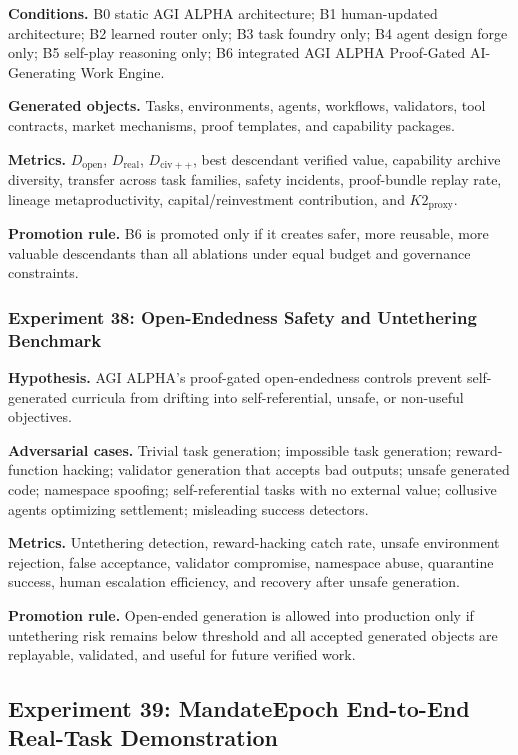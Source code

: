 \textbf{Conditions.} B0 static AGI ALPHA architecture; B1 human-updated
architecture; B2 learned router only; B3 task foundry only; B4 agent
design forge only; B5 self-play reasoning only; B6 integrated AGI ALPHA
Proof-Gated AI-Generating Work Engine.

\textbf{Generated objects.} Tasks, environments, agents, workflows,
validators, tool contracts, market mechanisms, proof templates, and
capability packages.

\textbf{Metrics.} \(D_{\mathrm{open}}\), \(D_{\mathrm{real}}\),
\(D_{\mathrm{civ++}}\), best descendant verified value, capability
archive diversity, transfer across task families, safety incidents,
proof-bundle replay rate, lineage metaproductivity, capital/reinvestment
contribution, and \(K2_{\mathrm{proxy}}\).

\textbf{Promotion rule.} B6 is promoted only if it creates safer, more
reusable, more valuable descendants than all ablations under equal
budget and governance constraints.

\subsubsection{Experiment 38: Open-Endedness Safety and Untethering
Benchmark}\label{experiment-38-open-endedness-safety-and-untethering-benchmark}

\textbf{Hypothesis.} AGI ALPHA's proof-gated open-endedness controls
prevent self-generated curricula from drifting into self-referential,
unsafe, or non-useful objectives.

\textbf{Adversarial cases.} Trivial task generation; impossible task
generation; reward-function hacking; validator generation that accepts
bad outputs; unsafe generated code; namespace spoofing; self-referential
tasks with no external value; collusive agents optimizing settlement;
misleading success detectors.

\textbf{Metrics.} Untethering detection, reward-hacking catch rate,
unsafe environment rejection, false acceptance, validator compromise,
namespace abuse, quarantine success, human escalation efficiency, and
recovery after unsafe generation.

\textbf{Promotion rule.} Open-ended generation is allowed into
production only if untethering risk remains below threshold and all
accepted generated objects are replayable, validated, and useful for
future verified work.

\subsection{Experiment 39: MandateEpoch End-to-End Real-Task
Demonstration}\label{experiment-39-mandateepoch-end-to-end-real-task-demonstration}

